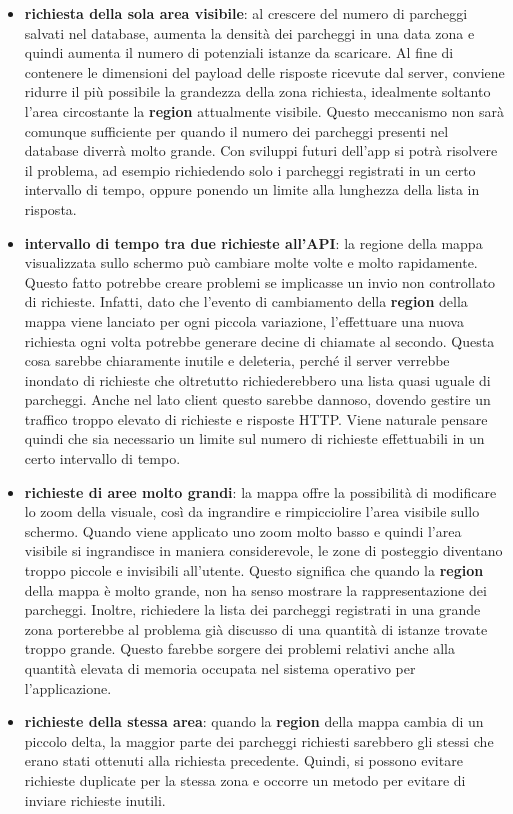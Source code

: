 \begin{itemize}
    \item \textbf{richiesta della sola area visibile}: al crescere del numero di parcheggi 
    salvati nel database, aumenta la densità dei parcheggi in una data zona e quindi 
    aumenta il numero di potenziali istanze da scaricare. Al fine di contenere le 
    dimensioni del payload delle risposte ricevute dal server, conviene ridurre il più
    possibile la grandezza della zona richiesta, idealmente soltanto l'area circostante
    la \textbf{region} attualmente visibile. Questo meccanismo non sarà comunque 
    sufficiente per quando il numero dei parcheggi presenti nel database diverrà
    molto grande. Con sviluppi futuri dell'app si potrà risolvere il problema, ad 
    esempio richiedendo solo i parcheggi registrati in un certo intervallo di tempo,
    oppure ponendo un limite alla lunghezza della lista in risposta.
    \item \textbf{intervallo di tempo tra due richieste all'API}: la regione della mappa
    visualizzata sullo schermo può cambiare molte volte e molto rapidamente. Questo fatto
    potrebbe creare problemi se implicasse un invio non controllato di richieste. Infatti,
    dato che l'evento di cambiamento della \textbf{region} della mappa viene lanciato per 
    ogni piccola variazione, l'effettuare una nuova richiesta ogni volta potrebbe 
    generare decine di chiamate al secondo. Questa cosa sarebbe chiaramente inutile e 
    deleteria, perché il server verrebbe inondato di richieste che oltretutto 
    richiederebbero una lista quasi uguale di parcheggi. Anche nel lato client questo 
    sarebbe dannoso, dovendo gestire un traffico troppo elevato di richieste e risposte
    HTTP. Viene naturale pensare quindi che sia necessario un limite sul numero di 
    richieste effettuabili in un certo intervallo di tempo.
    \item \textbf{richieste di aree molto grandi}: la mappa offre la possibilità di 
    modificare lo zoom della visuale, così da ingrandire e rimpicciolire l'area 
    visibile sullo schermo. Quando viene applicato uno zoom molto basso e quindi 
    l'area visibile si ingrandisce in maniera considerevole, le zone di posteggio
    diventano troppo piccole e invisibili all'utente. Questo significa che quando
    la \textbf{region} della mappa è molto grande, non ha senso mostrare la 
    rappresentazione dei parcheggi. Inoltre, richiedere la lista dei parcheggi
    registrati in una grande zona porterebbe al problema già discusso di una
    quantità di istanze trovate troppo grande. Questo farebbe sorgere dei 
    problemi relativi anche alla quantità elevata di memoria occupata nel
    sistema operativo per l'applicazione.
    \item \textbf{richieste della stessa area}: quando la \textbf{region} della mappa
    cambia di un piccolo delta, la maggior parte dei parcheggi richiesti sarebbero
    gli stessi che erano stati ottenuti alla richiesta precedente. Quindi, si possono
    evitare richieste duplicate per la stessa zona e occorre un metodo per evitare 
    di inviare richieste inutili.
\end{itemize}
